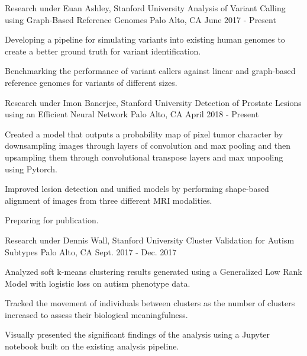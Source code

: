 \begin{cventries}
    
  \cventry
    {Research under Euan Ashley, Stanford University}
    {Analysis of Variant Calling using Graph-Based Reference Genomes}
    {Palo Alto, CA}
    {June 2017 - Present}
    {
      \begin{cvitems}
        \item {Developing a pipeline for simulating variants into existing human genomes to create a better ground truth for variant identification.}
        \item {Benchmarking the performance of variant callers against linear and graph-based reference genomes for variants of different sizes.}
      \end{cvitems}
    }
    
  \cventry
    {Research under Imon Banerjee, Stanford University}
    {Detection of Prostate Lesions using an Efficient Neural Network}
    {Palo Alto, CA}
    {April 2018 - Present}
    {
      \begin{cvitems}
        \item {Created a model that outputs a probability map of pixel tumor character by downsampling images through layers of convolution and max pooling and then upsampling them through convolutional transpose layers and max unpooling using Pytorch.}
        \item {Improved lesion detection and unified models by performing shape-based alignment of images from three different MRI modalities.}
        \item {Preparing for publication.}
      \end{cvitems} 
    }

  \cventry
    {Research under Dennis Wall, Stanford University}
    {Cluster Validation for Autism Subtypes}
    {Palo Alto, CA}
    {Sept. 2017 - Dec. 2017}
    {
      \begin{cvitems}
        \item {Analyzed soft k-means clustering results generated using a Generalized Low Rank Model with logistic loss on autism phenotype data.}
        \item {Tracked the movement of individuals between clusters as the number of clusters increased to assess their biological meaningfulness.}
        \item {Visually presented the significant findings of the analysis using a Jupyter notebook built on the existing analysis pipeline.}
      \end{cvitems}
    }
    
\end{cventries}
